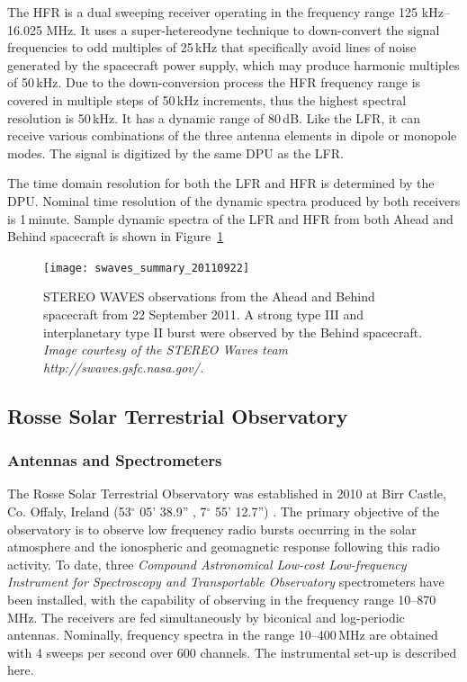 The HFR is a dual sweeping receiver operating in the frequency range 125 kHz--16.025 MHz. It uses a super-hetereodyne technique to down-convert the signal frequencies to odd multiples of 25\,kHz that specifically avoid lines of noise generated by the spacecraft power supply, which may produce harmonic multiples of 50\,kHz. Due to the down-conversion process the HFR frequency range is covered in multiple steps of 50\,kHz increments, thus the highest spectral resolution is 50\,kHz. It has a dynamic range of 80\,dB. Like the LFR, it can receive various combinations of the three antenna elements in dipole or monopole modes. The signal is digitized by the same DPU as the LFR.

The time domain resolution for both the LFR and HFR is determined by the DPU. Nominal time resolution of the dynamic spectra produced by both receivers is 1\,minute. Sample dynamic spectra of the LFR and HFR from both Ahead and Behind spacecraft is shown in Figure~\ref{fig:swaves_typeIIIs}
\begin{figure}
\centering
\texttt{[image: swaves\_summary\_20110922]}
\caption[STEREO WAVES observations]{STEREO WAVES observations from the Ahead and Behind spacecraft from 22 September 2011. A strong type III and interplanetary type II burst were observed by the Behind spacecraft. {\it Image courtesy of the STEREO Waves team http://swaves.gsfc.nasa.gov/.}}
\label{fig:swaves_typeIIIs}
\end{figure}


\subsection{Rosse Solar Terrestrial Observatory}\label{sec:30}

\subsubsection{Antennas and Spectrometers}
The Rosse Solar Terrestrial Observatory was established in 2010 at Birr Castle, Co. Offaly, Ireland (53$^{\circ}$ 05' 38.9'' , 7$^{\circ}$ 55' 12.7'') \citep{zucca2012}. The primary objective of the observatory is to observe low frequency radio bursts occurring in the solar atmosphere and the ionospheric and geomagnetic response following this radio activity.  To date, three \textit{Compound Astronomical Low-cost Low-frequency Instrument for Spectroscopy and Transportable Observatory} \citep[CALLISTO;][]{Benz2005} spectrometers have been installed, with the capability of observing in the frequency range 10--870\,MHz. The receivers are fed simultaneously by biconical and log-periodic antennas. Nominally, frequency spectra in the range 10--400\,MHz are obtained with 4 sweeps per second over 600 channels. The instrumental set-up is described here.

